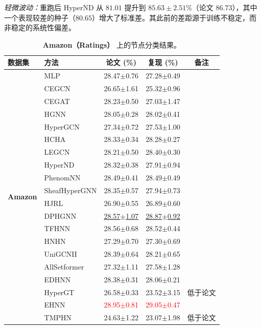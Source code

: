 \documentclass[11pt,a4paper]{article}
\begin{document}
\noindent\textit{轻微波动：}重跑后 HyperND 从 $81.01$ 提升到 $85.63\pm2.51\%$（论文 $86.73$），其中一个表现较差的种子（$80.65$）增大了标准差。其此前的差距源于训练不稳定，而非稳定的系统性偏差。

\begin{table}[H]
	\centering\small
	\begin{tabular}{llccc}
		\toprule
		数据集 & 方法 & 论文 (\%) & 复现 (\%) & 备注 \\
		\midrule
		\multirow{20}{*}{\textbf{Amazon}} & MLP               & 28.47$\pm$0.76   & 27.28$\pm$0.49   &  \\
		 & CEGCN             & 26.65$\pm$1.61   & 25.32$\pm$0.96   &  \\
		 & CEGAT             & 28.23$\pm$0.50   & 27.03$\pm$1.47   &  \\
		 & HGNN              & 28.05$\pm$0.28   & 28.02$\pm$0.41   &  \\
		 & HyperGCN          & 27.34$\pm$0.72   & 27.53$\pm$1.00   &  \\
		 & HCHA              & 28.33$\pm$0.34   & 28.28$\pm$0.27   &  \\
		 & LEGCN             & 28.21$\pm$0.50   & 28.40$\pm$0.30   &  \\
		 & HyperND           & 28.32$\pm$0.38   & 27.91$\pm$0.94   &  \\
		 & PhenomNN          & 28.49$\pm$0.41   & 28.49$\pm$0.49   &  \\
		 & SheafHyperGNN     & 28.35$\pm$0.57   & 27.94$\pm$0.73   &  \\
		 & HJRL              & 26.90$\pm$0.55   & 26.89$\pm$0.60   &  \\
		 & DPHGNN            & \underline{28.57$\pm$1.07}   & \underline{28.87$\pm$0.92}   &  \\
		 & TFHNN             & 28.56$\pm$0.68   & 28.52$\pm$0.44   &  \\
		 & HNHN              & 27.29$\pm$0.70   & 27.30$\pm$0.69   &  \\
		 & UniGCNII          & 28.39$\pm$0.64   & 28.21$\pm$0.65   &  \\
		 & AllSetformer      & 27.32$\pm$1.11   & 27.58$\pm$1.28   &  \\
		 & EDHNN             & 28.38$\pm$0.31   & 28.06$\pm$0.21   &  \\
		 & HyperGT           & 26.58$\pm$0.33   & 23.52$\pm$3.15   & 低于论文 \\
		 & EHNN              & \textcolor{red}{28.95$\pm$0.81}   & \textcolor{red}{29.05$\pm$0.47}   &  \\
		 & TMPHN             & 24.63$\pm$1.22   & 23.07$\pm$1.98   & 低于论文 \\
		\bottomrule
	\end{tabular}
	\caption{\textbf{Amazon（Ratings）} 上的节点分类结果。}
\end{table}
\end{document}
